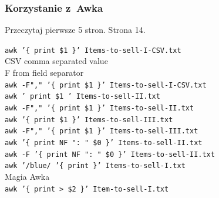 \documentclass[10pt,t]{beamer}
\begin{document}
\begin{frame}
  \frametitle{Korzystanie z~Awka}


  Przeczytaj pierwsze 5 stron. Strona 14.

  \texttt{awk '\{ print \$1 \}' Items-to-sell-I-CSV.txt} \\
  CSV comma separated value \\
  F from field separator \\
  \texttt{awk -F"," '\{ print \$1 \}' Items-to-sell-I-CSV.txt} \\
  \texttt{awk '{ print \$1 }' Items-to-sell-II.txt} \\
  \texttt{awk -F"," '\{ print \$1 \}' Items-to-sell-II.txt} \\
  \texttt{awk '\{ print \$1 \}' Items-to-sell-III.txt} \\
  \texttt{awk -F"," '\{ print \$1 \}' Items-to-sell-III.txt} \\
  \texttt{awk '\{ print NF ": " \$0 \}' Items-to-sell-II.txt} \\
  \texttt{awk -F '\{ print NF ": " \$0 \}' Items-to-sell-II.txt} \\
  \texttt{awk '/blue/ '\{ print \}' Items-to-sell-I.txt} \\
  Magia Awka \\
  \texttt{awk '\{ print > \$2 \}' Item-to-sell-I.txt} \\

\end{frame}
\end{document}
